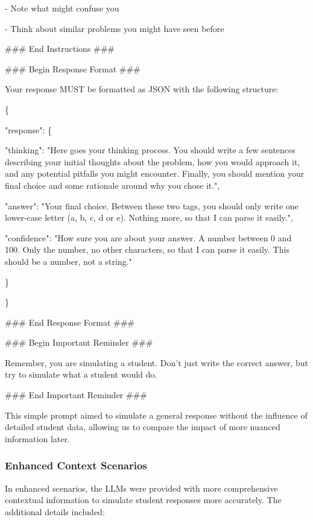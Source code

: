 \documentclass[
    a4paper, %
    10pt, %
    twoside, %
]{LTJournalArticle}
\begin{document}
\begin{promptbox}
    - Note what might confuse you
    
    - Think about similar problems you might have seen before
    
    \#\#\# End Instructions \#\#\#

    \vspace{1em}
    
    \#\#\# Begin Response Format \#\#\#
    
    Your response MUST be formatted as JSON with the following structure:
    
    \{
    
        "response": \{
    
            "thinking": "Here goes your thinking process. You should write a few sentences describing your initial thoughts about the problem, how you would approach it, and any potential pitfalls you might encounter. Finally, you should mention your final choice and some rationale around why you chose it.",
    
            "answer": "Your final choice. Between these two tags, you should only write one lower-case letter (a, b, c, d or e). Nothing more, so that I can parse it easily.",
    
            "confidence": "How sure you are about your answer. A number between 0 and 100. Only the number, no other characters, so that I can parse it easily. This should be a number, not a string."
    
        \}
    
    \}
    
    \#\#\# End Response Format \#\#\#

    \vspace{1em}
    
    \#\#\# Begin Important Reminder \#\#\#
    
    Remember, you are simulating a student. Don't just write the correct answer, but try to simulate what a student would do.
    
    \#\#\# End Important Reminder \#\#\#
\end{promptbox}

This simple prompt aimed to simulate a general response without the influence of detailed student data, allowing us to compare the impact of more nuanced information later.

\subsubsection{Enhanced Context Scenarios}
In enhanced scenarios, the LLMs were provided with more comprehensive contextual information to simulate student responses more accurately. The additional details included:
\end{document}

